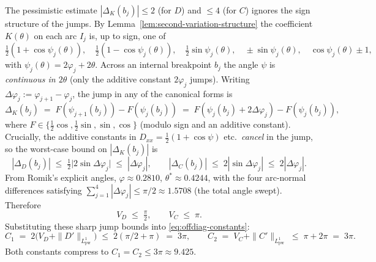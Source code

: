 The pessimistic estimate $|\Delta_{K}(b_{j})| \leq 2$ (for $D$) and
$\leq 4$ (for $C$) ignores the sign structure of the jumps.  By
Lemma~\ref{lem:second-variation-structure} the coefficient $K(\theta)$
on each arc $I_{j}$ is, up to sign, one of
\[
   \tfrac{1}{2}(1+\cos\psi_{j}(\theta)),\quad
   \tfrac{1}{2}(1-\cos\psi_{j}(\theta)),\quad
   \tfrac{1}{2}\sin\psi_{j}(\theta),\quad
   \pm\sin\psi_{j}(\theta),\quad
   \cos\psi_{j}(\theta) \pm 1,
\]
with $\psi_{j}(\theta) = 2\varphi_{j} + 2\theta$.  Across an internal
breakpoint $b_{j}$ the angle $\psi$ is \emph{continuous in
$2\theta$} (only the additive constant $2\varphi_{j}$ jumps).  Writing
$\Delta\varphi_{j} := \varphi_{j+1} - \varphi_{j}$, the jump in any of
the canonical forms is
\begin{equation}\label{eq:jump-explicit}
   \Delta_{K}(b_{j}) \;=\; F(\psi_{j+1}(b_{j})) - F(\psi_{j}(b_{j}))
   \;=\; F(\psi_{j}(b_{j}) + 2\Delta\varphi_{j}) - F(\psi_{j}(b_{j})),
\end{equation}
where $F \in \{\frac{1}{2}\cos, \frac{1}{2}\sin, \sin, \cos\}$
(modulo sign and an additive constant).  Crucially, the additive
constants in $D_{xx} = \frac{1}{2}(1+\cos\psi)$ etc.\ \emph{cancel}
in the jump, so the worst-case bound on $|\Delta_{K}(b_{j})|$ is
\begin{equation}\label{eq:jump-sharp}
   |\Delta_{D}(b_{j})| \;\leq\; \tfrac{1}{2}\bigl|2\sin\Delta\varphi_{j}\bigr|
                              \;\leq\; |\Delta\varphi_{j}|,
   \qquad
   |\Delta_{C}(b_{j})| \;\leq\; 2|\sin\Delta\varphi_{j}|
                              \;\leq\; 2|\Delta\varphi_{j}|.
\end{equation}
From Romik's explicit angles,
$\varphi \approx 0.2810$, $\theta^{\ast} \approx 0.4244$, with the
four arc-normal differences satisfying
$\sum_{j=1}^{4} |\Delta\varphi_{j}| \leq \pi/2 \approx 1.5708$ (the
total angle swept).  Therefore
\begin{equation}\label{eq:VK-sharp}
   V_{D} \;\leq\; \tfrac{\pi}{2}, \qquad
   V_{C} \;\leq\; \pi.
\end{equation}
Substituting these sharp jump bounds into \eqref{eq:offdiag-constants}:
\begin{equation}\label{eq:CD-final-sharp}
   C_{1} \;=\; 2\bigl(V_{D} + \|D'\|_{L^{1}_{\mathrm{pw}}}\bigr)
   \;\leq\; 2(\pi/2 + \pi) \;=\; 3\pi,
   \qquad
   C_{2} \;=\; V_{C} + \|C'\|_{L^{1}_{\mathrm{pw}}}
   \;\leq\; \pi + 2\pi \;=\; 3\pi.
\end{equation}
Both constants compress to $C_{1} = C_{2} \leq 3\pi \approx 9.425$.

